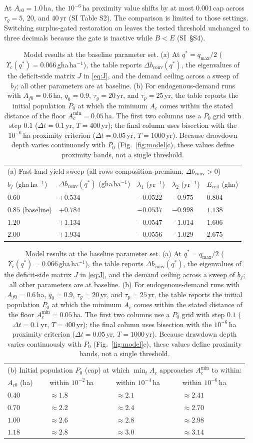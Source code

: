 \documentclass[preprint,12pt,authoryear]{elsarticle}
\newcommand{\dconv}{\Delta b_{\mathrm{conv}}}
\newcommand{\Ups}{\Upsilon_c}
\newcommand{\Eceil}{E_{\mathrm{ceil}}}
\newcommand{\Acmin}{A_c^{\min}}
\begin{document}
At $A_{c0}=1.0$\,ha, the $10^{-6}$\,ha proximity value shifts by at most $0.001$\,cap across $\tau_g=5$, $20$, and $40$\,yr (SI Table S2). The comparison is limited to those settings. Switching surplus-gated restoration on leaves the tested threshold unchanged to three decimals because the gate is inactive while $B<E$ (SI~\S S4).

\begin{table}[!htbp]
\centering\small
\caption{Model results at the baseline parameter set. (a) At $q^*=q_{\max}/2$ ($\Ups(q^*)=0.066$\,gha\,ha$^{-1}$), the table reports $\dconv(q^*)$, the eigenvalues of the deficit-side matrix $J$ in \eqref{eq:J}, and the demand ceiling across a sweep of $b_f$; all other parameters are at baseline. (b) For endogenous-demand runs with $A_{f0}=0.6$\,ha, $q_0=0.9$, $\tau_g=20$\,yr, and $\tau_p=25$\,yr, the table reports the initial population $P_0$ at which the minimum $A_c$ comes within the stated distance of the floor $\Acmin=0.05$\,ha. The first two columns use a $P_0$ grid with step $0.1$ ($\Delta t=0.1$\,yr, $T=400$\,yr); the final column uses bisection with the $10^{-6}$\,ha proximity criterion ($\Delta t=0.05$\,yr, $T=1000$\,yr). Because drawdown depth varies continuously with $P_0$ (Fig.~\ref{fig:model}c), these values define proximity bands, not a single threshold.}
\label{tab:model}
\begin{tabular}{l l l l l}
\toprule
\multicolumn{5}{l}{(a) Fast-land yield sweep (all rows composition-premium, $\dconv>0$)}\\
$b_f$ (gha\,ha$^{-1}$) & $\dconv(q^*)$ (gha\,ha$^{-1}$) & $\lambda_1$ (yr$^{-1}$) & $\lambda_2$ (yr$^{-1}$) & $\Eceil$ (gha) \\
\midrule
$0.60$ & $+0.534$ & $-0.0522$ & $-0.975$ & $0.804$ \\
$0.85$ (baseline) & $+0.784$ & $-0.0537$ & $-0.998$ & $1.138$ \\
$1.20$ & $+1.134$ & $-0.0547$ & $-1.014$ & $1.606$ \\
$2.00$ & $+1.934$ & $-0.0556$ & $-1.029$ & $2.675$ \\
\bottomrule
\end{tabular}

\medskip
\begin{tabular}{l l l l}
\toprule
\multicolumn{4}{l}{(b) Initial population $P_0$ (cap) at which $\min_tA_c$ approaches $\Acmin$ to within:}\\ 
$A_{c0}$ (ha) & within $10^{-2}$\,ha & within $10^{-4}$\,ha & within $10^{-6}$\,ha \\
\midrule
$0.40$ & $\approx1.8$ & $\approx2.1$ & $\approx2.41$ \\
$0.70$ & $\approx2.2$ & $\approx2.4$ & $\approx2.70$ \\
$1.00$ & $\approx2.6$ & $\approx2.8$ & $\approx2.98$ \\
$1.18$ & $\approx2.8$ & $\approx3.0$ & $\approx3.14$ \\
\bottomrule
\end{tabular}
\end{table}
\end{document}
